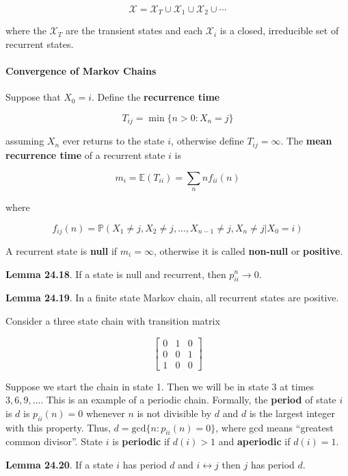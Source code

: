 \[ \mathcal{X} = \mathcal{X}_{T} \cup \mathcal{X}_{1} \cup \mathcal{X}_{2} \cup \cdots \]

where the \(\mathcal{X}_T\) are the transient states and each
\(\mathcal{X}_{i}\) is a closed, irreducible set of recurrent states.

\paragraph{Convergence of Markov Chains}\label{convergence-of-markov-chains}

Suppose that \(X_{0} = i\). Define the \textbf{recurrence time}

\[ T_{ij} = \min \{ n > 0 : X_{n} = j \} \]

assuming \(X_{n}\) ever returns to the state \(i\), otherwise define
\(T_{ij} = \infty\). The \textbf{mean recurrence time} of a recurrent
state \(i\) is

\[ m_{i} = \mathbb{E}(T_{ii}) = \sum_{n} n f_{ii}(n) \]

where

\[ f_{ij}(n) = \mathbb{P}(X_{1} \neq j, X_{2} \neq j, \dots, X_{n-1} \neq j, X_{n} \neq j | X_{0} = i) \]

A recurrent state is \textbf{null} if \(m_{i} = \infty\), otherwise it is
called \textbf{non-null} or \textbf{positive}.

\textbf{Lemma 24.18}. If a state is null and recurrent, then
\(p_{ii}^{n} \rightarrow 0\).

\textbf{Lemma 24.19}. In a finite state Markov chain, all recurrent
states are positive.

Consider a three state chain with transition matrix

\[
\begin{bmatrix}
0 & 1 & 0 \\
0 & 0 & 1 \\
1 & 0 & 0
\end{bmatrix}
\]

Suppose we start the chain in state 1. Then we will be in state 3 at
times \(3, 6, 9, \dots\). This is an example of a periodic chain.
Formally, the \textbf{period} of state \(i\) is \(d\) is
\(p_{ii}(n) = 0\) whenever \(n\) is not divisible by \(d\) and \(d\) is
the largest integer with this property. Thus,
\(d = \text{gcd} \{ n : p_{ii}(n) = 0 \}\), where gcd means ``greatest
common divisor''. State \(i\) is \textbf{periodic} if \(d(i) > 1\) and
\textbf{aperiodic} if \(d(i) = 1\).

\textbf{Lemma 24.20}. If a state \(i\) has period \(d\) and
\(i \leftrightarrow j\) then \(j\) has period \(d\).

